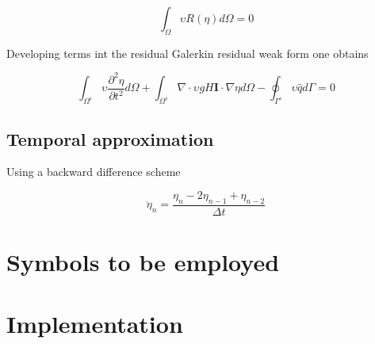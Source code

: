 \documentclass[a4paper,12pt]{article}
\begin{document}
\begin{equation}
\int_{\Omega} \upsilon R\left(\eta\right) d\Omega = 0
\end{equation}

Developing terms int the residual Galerkin residual weak form one obtains

\begin{equation}
\int_{\Omega^{e}} \upsilon \frac{\partial^{2}\eta}{\partial t^{2}} d\Omega + 
\int	_{\Omega^{e}} \nabla \cdot \upsilon gH\mathbf{I} \cdot \nabla\eta d\Omega -
\oint_{\Gamma^{e}} \upsilon\hat{q} d\Gamma = 0
\end{equation}



\subsection*{Temporal approximation}

Using a backward difference scheme

\begin{equation}
\ddot{\eta}_{n} =
\frac{\eta_{n} - 2\eta_{n-1} + \eta_{n-2}}{\Delta t}
\end{equation}


\section{Symbols to be employed}



\section{Implementation}
\end{document}
